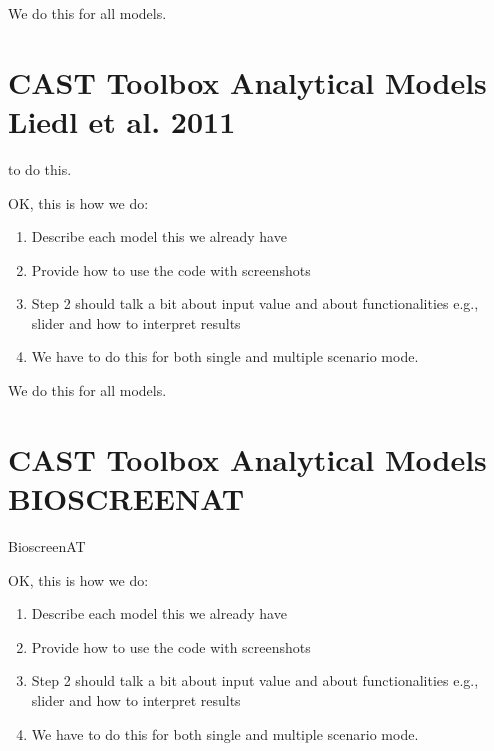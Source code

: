 \documentclass[letterpaper,10pt,english]{sphinxmanual}
\begin{document}
\sphinxAtStartPar
We do this for all models.


\section{CAST Toolbox \sphinxhyphen{} Analytical Models \sphinxhyphen{} Liedl et al. 2011}
\label{\detokenize{contents/toolbox/an_model/liedl2011:cast-toolbox-analytical-models-liedl-et-al-2011}}\label{\detokenize{contents/toolbox/an_model/liedl2011::doc}}
\sphinxAtStartPar
{} to do this.

\sphinxAtStartPar
OK, this is how we do:
\begin{enumerate}
%
\item {} 
\sphinxAtStartPar
Describe each model \sphinxhyphen{} this we already have

\item {} 
\sphinxAtStartPar
Provide how to use the code with screenshots

\item {} 
\sphinxAtStartPar
Step 2 should talk a bit about input value and about functionalities \sphinxhyphen{} e.g., slider and how to interpret results

\item {} 
\sphinxAtStartPar
We have to do this for both single and multiple scenario mode.

\end{enumerate}

\sphinxAtStartPar
We do this for all models.


\section{CAST Toolbox \sphinxhyphen{} Analytical Models \sphinxhyphen{} BIOSCREEN\sphinxhyphen{}AT}
\label{\detokenize{contents/toolbox/an_model/bioscreen:cast-toolbox-analytical-models-bioscreen-at}}\label{\detokenize{contents/toolbox/an_model/bioscreen::doc}}
\sphinxAtStartPar
{} Bioscreen\sphinxhyphen{}AT

\sphinxAtStartPar
OK, this is how we do:
\begin{enumerate}
%
\item {} 
\sphinxAtStartPar
Describe each model \sphinxhyphen{} this we already have

\item {} 
\sphinxAtStartPar
Provide how to use the code with screenshots

\item {} 
\sphinxAtStartPar
Step 2 should talk a bit about input value and about functionalities \sphinxhyphen{} e.g., slider and how to interpret results

\item {} 
\sphinxAtStartPar
We have to do this for both single and multiple scenario mode.

\end{enumerate}
\end{document}
